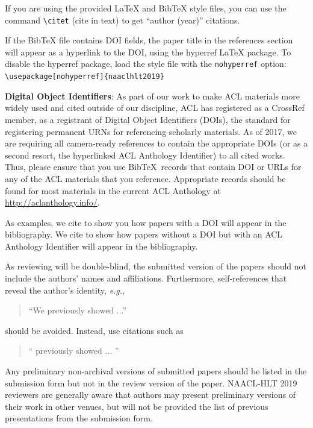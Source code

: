 \documentclass{article}
\begin{document}
If you are using the provided \LaTeX{} and Bib\TeX{} style files, you
can use the command \verb|\citet| (cite in text)
to get ``author (year)'' citations.

If the Bib\TeX{} file contains DOI fields, the paper
title in the references section will appear as a hyperlink
to the DOI, using the hyperref \LaTeX{} package.
To disable the hyperref package, load the style file
with the \verb|nohyperref| option: \\{\small
\verb|\usepackage[nohyperref]{naaclhlt2019}|}


\textbf{Digital Object Identifiers}:  As part of our work to make ACL
materials more widely used and cited outside of our discipline, ACL
has registered as a CrossRef member, as a registrant of Digital Object
Identifiers (DOIs), the standard for registering permanent URNs for
referencing scholarly materials.  As of 2017, we are requiring all
camera-ready references to contain the appropriate DOIs (or as a
second resort, the hyperlinked ACL Anthology Identifier) to all cited
works.  Thus, please ensure that you use Bib\TeX\ records that contain
DOI or URLs for any of the ACL materials that you reference.
Appropriate records should be found for most materials in the current
ACL Anthology at \url{http://aclanthology.info/}.

As examples, we cite \cite{P16-1001} to show you how papers with a DOI
will appear in the bibliography.  We cite \cite{C14-1001} to show how
papers without a DOI but with an ACL Anthology Identifier will appear
in the bibliography.  

As reviewing will be double-blind, the submitted version of the papers
should not include the authors' names and affiliations. Furthermore,
self-references that reveal the author's identity, {\em e.g.},
\begin{quote}
``We previously showed \cite{Gusfield:97} ...''  
\end{quote}
should be avoided. Instead, use citations such as 
\begin{quote}
``\citeauthor{Gusfield:97} 
previously showed ... ''
\end{quote}

Any preliminary non-archival versions of submitted papers should be listed in the submission form but not in the review version of the paper. NAACL-HLT 2019 reviewers are generally aware that authors may present preliminary versions of their work in other venues, but will not be provided the list of previous presentations from the submission form. 
\end{document}
